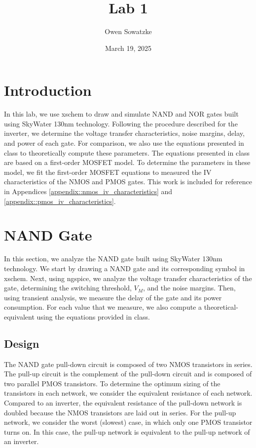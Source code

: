 \documentclass[fleqn]{article}
\title{Lab 1}
\author{Owen Sowatzke}
\date{March 19, 2025}
\newcommand{\zerodisplayskip}{
	\setlength{\abovedisplayskip}{0pt}%
	\setlength{\belowdisplayskip}{0pt}%
	\setlength{\abovedisplayshortskip}{0pt}%
	\setlength{\belowdisplayshortskip}{0pt}%
	\setlength{\mathindent}{0pt}}
\begin{document}
	\maketitle
	
	\section{Introduction}
	
	In this lab, we use xschem to draw and simulate NAND and NOR gates built using SkyWater 130nm technology. Following the procedure described for the inverter, we determine the voltage transfer characteristics, noise margins, delay, and power of each gate. For comparison, we also use the equations presented in class to theoretically compute these parameters. The equations presented in class are based on a first-order MOSFET model. To determine the parameters in these model, we fit the first-order MOSFET equations to measured the IV characteristics of the NMOS and PMOS gates. This work is included for reference in Appendices \ref{appendix::nmos_iv_characteristics} and \ref{appendix::pmos_iv_characteristics}.
	
	\section{NAND Gate}
	
	In this section, we analyze the NAND gate built using SkyWater 130nm technology. We start by drawing a NAND gate and its corresponding symbol in xschem. Next, using ngspice, we analyze the voltage transfer characteristics of the gate, determining the switching threshold, $V_M$, and the noise margins. Then, using transient analysis, we measure the delay of the gate and its power consumption. For each value that we measure, we also compute a theoretical-equivalent using the equations provided in class.
	
	\subsection{Design}
	
	The NAND gate pull-down circuit is composed of two NMOS transistors in series. The pull-up circuit is the complement of the pull-down circuit and is composed of two parallel PMOS transistors. To determine the optimum sizing of the transistors in each network, we consider the equivalent resistance of each network. Compared to an inverter, the equivalent resistance of the pull-down network is doubled because the NMOS transistors are laid out in series. For the pull-up network, we consider the worst (slowest) case, in which only one PMOS transistor turns on. In this case, the pull-up network is equivalent to the pull-up network of an inverter.
	
\end{document}
